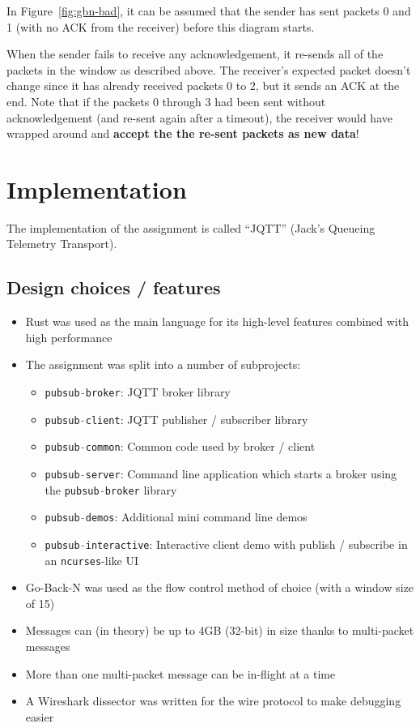 \documentclass[a4paper]{article}
\numberwithin{figure}{section}
\numberwithin{table}{section}
\newcommand{\mi}{\mintinline}
\begin{document}
\newpage
In Figure~\ref{fig:gbn-bad}, it can be assumed that the sender has sent packets 0 and 1 (with no ACK from the receiver) before this diagram starts.

When the sender fails to receive any acknowledgement, it re-sends all of the packets in the window as described above. The receiver's expected packet doesn't change since it has already received packets 0 to 2, but it sends an ACK at the end. Note that if the packets 0 through 3 had been sent without acknowledgement (and re-sent again after a timeout), the receiver would have wrapped around and \textbf{accept the the re-sent packets as new data}!

\section{Implementation}
The implementation of the assignment is called ``JQTT'' (Jack's Queueing Telemetry Transport).
\subsection{Design choices / features}
\begin{itemize}
	\item Rust was used as the main language for its high-level features combined with high performance \cite{rust-lang}
	\item The assignment was split into a number of subprojects:
		\begin{itemize}
			\item \mi{c}{pubsub-broker}: JQTT broker library
			\item \mi{c}{pubsub-client}: JQTT publisher / subscriber library
			\item \mi{c}{pubsub-common}: Common code used by broker / client
			\item \mi{c}{pubsub-server}: Command line application which starts a broker using the \mi{c}{pubsub-broker} library
			\item \mi{c}{pubsub-demos}: Additional mini command line demos
			\item \mi{c}{pubsub-interactive}: Interactive client demo with publish / subscribe in an \mi{c}{ncurses}-like UI
		\end{itemize}
	\item Go-Back-N was used as the flow control method of choice (with a window size of 15)
	\item Messages can (in theory) be up to 4GB (32-bit) in size thanks to multi-packet messages
	\item More than one multi-packet message can be in-flight at a time
	\item A Wireshark dissector was written for the wire protocol to make debugging easier
\end{itemize}
\end{document}
